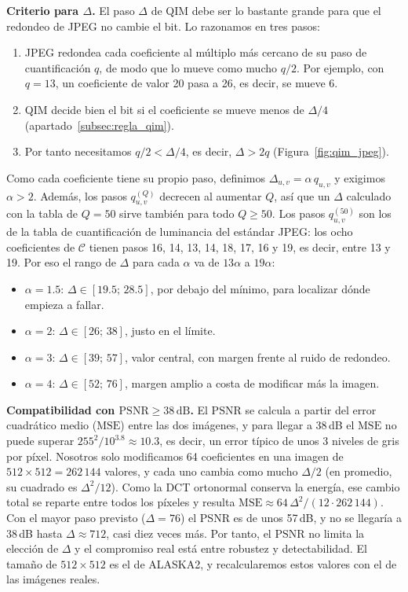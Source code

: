 \documentclass[IB]{TFUOC}%
\begin{document}
\textbf{Criterio para $\Delta$.} El paso $\Delta$ de QIM debe ser lo bastante grande para que el redondeo de JPEG no cambie el bit. Lo razonamos en tres pasos:
\begin{enumerate}
    \item JPEG redondea cada coeficiente al múltiplo más cercano de su paso de cuantificación $q$, de modo que lo mueve como mucho $q/2$. Por ejemplo, con $q=13$, un coeficiente de valor 20 pasa a 26, es decir, se mueve 6.
    \item QIM decide bien el bit si el coeficiente se mueve menos de $\Delta/4$ (apartado~\ref{subsec:regla_qim}).
    \item Por tanto necesitamos $q/2<\Delta/4$, es decir, $\Delta>2q$ (Figura~\ref{fig:qim_jpeg}).
\end{enumerate}
Como cada coeficiente tiene su propio paso, definimos $\Delta_{u,v}=\alpha\,q_{u,v}$ y exigimos $\alpha>2$. Además, los pasos $q^{(Q)}_{u,v}$ decrecen al aumentar $Q$, así que un $\Delta$ calculado con la tabla de $Q=50$ sirve también para todo $Q\geq 50$. Los pasos $q^{(50)}_{u,v}$ son los de la tabla de cuantificación de luminancia del estándar JPEG: los ocho coeficientes de $\mathcal{C}$ tienen pasos 16, 14, 13, 14, 18, 17, 16 y 19, es decir, entre 13 y 19. Por eso el rango de $\Delta$ para cada $\alpha$ va de $13\alpha$ a $19\alpha$:

\begin{itemize}
    \item $\alpha=1{.}5$: $\Delta\in[19{.}5;\,28{.}5]$, por debajo del mínimo, para localizar dónde empieza a fallar.
    \item $\alpha=2$: $\Delta\in[26;\,38]$, justo en el límite.
    \item $\alpha=3$: $\Delta\in[39;\,57]$, valor central, con margen frente al ruido de redondeo.
    \item $\alpha=4$: $\Delta\in[52;\,76]$, margen amplio a costa de modificar más la imagen.
\end{itemize}

\textbf{Compatibilidad con $\mathrm{PSNR}\geq 38\,\mathrm{dB}$.} El $\mathrm{PSNR}$ se calcula a partir del error cuadrático medio ($\mathrm{MSE}$) entre las dos imágenes, y para llegar a 38\,dB el $\mathrm{MSE}$ no puede superar $255^2/10^{3{.}8}\approx 10{.}3$, es decir, un error típico de unos 3 niveles de gris por píxel. Nosotros solo modificamos 64 coeficientes en una imagen de $512\times512=262\,144$ valores, y cada uno cambia como mucho $\Delta/2$ (en promedio, su cuadrado es $\Delta^2/12$). Como la DCT ortonormal conserva la energía, ese cambio total se reparte entre todos los píxeles y resulta $\mathrm{MSE}\approx 64\,\Delta^2/(12\cdot 262\,144)$. Con el mayor paso previsto ($\Delta=76$) el $\mathrm{PSNR}$ es de unos 57\,dB, y no se llegaría a 38\,dB hasta $\Delta\approx 712$, casi diez veces más. Por tanto, el $\mathrm{PSNR}$ no limita la elección de $\Delta$ y el compromiso real está entre robustez y detectabilidad. El tamaño de $512\times512$ es el de ALASKA2, y recalcularemos estos valores con el de las imágenes reales.
\end{document}

